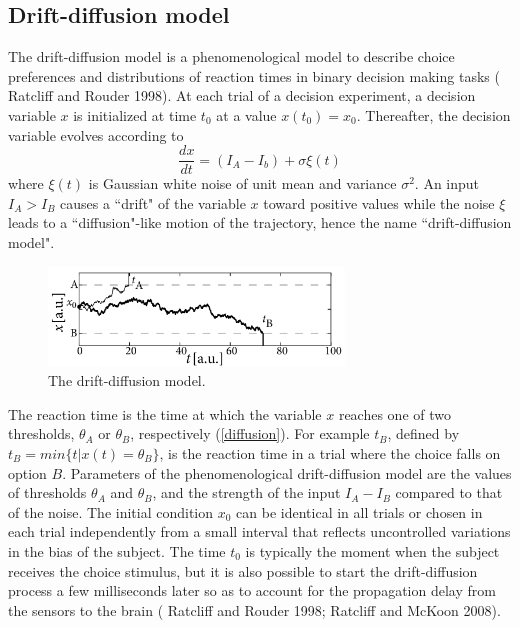 \documentclass[12pt,hyperref,a4paper,UTF8]{ctexart}
\begin{document}
\subsection{Drift-diffusion model}

The drift-diffusion model is a phenomenological model to describe choice preferences and distributions of reaction times in binary decision making tasks (\cite{Ratcliff and Rouder 1998} Ratcliff and Rouder 1998). At each trial of a decision experiment, a decision variable $x$ is initialized at time $t_0$ at a value $x(t_0) = x_0$. Thereafter, the decision variable evolves according to
$$\frac{dx}{dt}=(I_A-I_b)+\sigma \xi (t)$$
where $\xi (t)$ is Gaussian white noise of unit mean and variance $\sigma^2$. An input $I_A > I_B$ causes a ``drift" of the variable $x$ toward positive values while the noise $\xi$ leads to a ``diffusion"-like motion of the trajectory, hence the name ``drift-diffusion model".

\begin{figure}[h]
    \begin{center}
    \includegraphics[width=0.7\textwidth]{diffusion.png}
    \caption{The drift-diffusion model.}
    \label{diffusion}
    \end{center}
\end{figure}

The reaction time is the time at which the variable $x$ reaches one of two thresholds, $\theta_A$ or $\theta_B$, respectively (\autoref{diffusion}). For example $t_B$, defined by $t_B = min \{t|x(t) = \theta_B\}$, is the reaction time in a trial where the choice falls on option $B$. Parameters of the phenomenological drift-diffusion model are the values of thresholds $\theta_A$ and $\theta_B$, and the strength of the input $I_A-I_B$ compared to that of the noise. The initial condition $x_0$ can be identical in all trials or chosen in each trial independently from a small interval that reflects uncontrolled variations in the bias of the subject. The time $t_0$ is typically the moment when the subject receives the choice stimulus, but it is also possible to start the drift-diffusion process a few milliseconds later so as to account for the propagation delay from the sensors to the brain (\cite{Ratcliff and Rouder 1998} Ratcliff and Rouder 1998; \cite{Ratcliff and McKoon 2008} Ratcliff and McKoon 2008).
\end{document}

